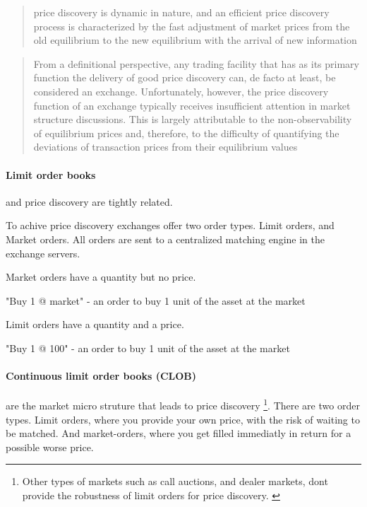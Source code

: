 \documentclass[12pt]{article}
\begin{document}
\begin{quote}
    price discovery is dynamic in nature, and an efficient price discovery process is characterized by the fast adjustment of market prices from the old equilibrium to the new equilibrium with the arrival of new information \cite{RePEc:udb:wpaper:uwec-2005-01-r}    
\end{quote}


\begin{quote}
From a definitional perspective, any trading facility that has as its primary function the delivery of good price discovery can, de facto at least, be considered an exchange. Unfortunately, however, the price discovery function of an  exchange typically receives insufficient attention in market structure discussions. This is largely attributable to the non-observability of equilibrium prices and, therefore, to the difficulty of quantifying the deviations of transaction prices from their equilibrium values \cite{francioni_schwartz_2017}
\end{quote} 


\paragraph*{Limit order books} and price discovery are tightly related. \citep{RePEc:nbr:nberwo:6257} \cite{RePEc:eee:jfinec:v:17:y:1986:i:1:p:5-26}

To achive price discovery exchanges offer two order types. Limit orders, and Market orders. All orders are sent to a centralized matching engine in the exchange servers. 


Market orders have a quantity but no price. 

\begin{enumerate*}
    \item "Buy 1 @ market" - an order to buy 1 unit of the asset at the market  
\end{enumerate*}

Limit orders have a quantity and a price. 

\begin{enumerate*}
    \item "Buy 1 @ 100" - an order to buy 1 unit of the asset at the market  
\end{enumerate*}



\paragraph*{Continuous limit order books (CLOB)}   are the market micro struture that leads to price discovery \footnote{Other types of markets such as call auctions, and dealer markets, dont provide the robustness of limit orders for price discovery. \cite{RePEc:hal:journl:hal-00459785}}. There are two order types. Limit orders, where you provide your own price, with the risk of waiting to be matched. And market-orders, where you get filled immediatly in return for a possible worse price.
\end{document}
